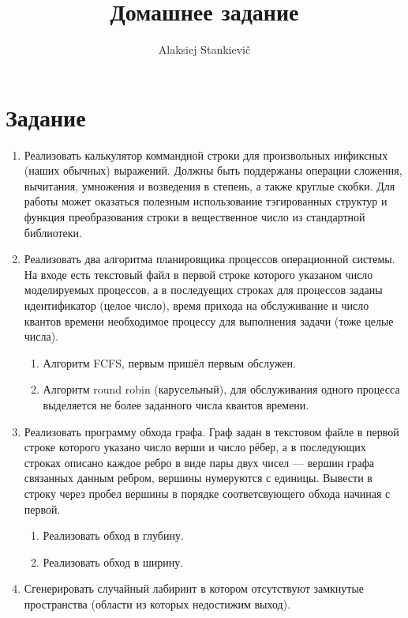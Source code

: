 \documentclass[12pt]{article}
\author{Alaksiej Stankievič}
\title{Домашнее задание}
\begin{document}

\section{Задание}


\begin{enumerate}
 \item Реализовать калькулятор коммандной строки для произвольных инфиксных 
(наших обычных) выражений. Должны быть поддержаны операции сложения, вычитания, 
умножения и возведения в степень, а также круглые скобки. Для работы может 
оказаться полезным использование тэгированных структур и функция преобразования 
строки в вещественное число из стандартной библиотеки.
 \item Реализовать два алгоритма планировщика процессов операционной системы. 
На входе есть текстовый файл в первой строке которого указаном число 
моделируемых процессов, а в последуещих строках для процессов заданы 
идентификатор (целое число), время прихода на обслуживание и число квантов 
времени необходимое процессу для выполнения задачи (тоже целые числа).
 \begin{enumerate}
  \item Алгоритм FCFS, первым пришёл первым обслужен.
  \item Алгоритм round robin (карусельный), для обслуживания одного процесса 
выделяется не более заданного числа квантов времени.
 \end{enumerate}
 \item Реализовать программу обхода графа. Граф задан в текстовом файле в 
первой строке которого указано число верши и число рёбер, а в последующих 
строках описано каждое ребро в виде пары двух чисел --- вершин графа связанных 
данным ребром, вершины нумеруются с единицы. Вывести в строку через пробел 
вершины в порядке соответсвующего обхода начиная с первой.
\begin{enumerate}
 \item Реализовать обход в глубину.
 \item Реализовать обход в ширину.
\end{enumerate}
 \item  Сгенерировать случайный лабиринт в котором отсутствуют замкнутые 
пространства (области из которых недостижим выход).
\end{enumerate}
\end{document}
